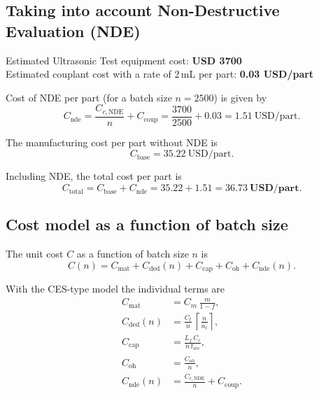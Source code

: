 \documentclass[11pt]{article}
\begin{document}
\subsection*{Taking into account Non-Destructive Evaluation (NDE)}

Estimated Ultrasonic Test equipment cost: \textbf{USD 3700} \\
Estimated couplant cost with a rate of \(2\,\text{mL}\) per part:
\textbf{0.03 USD/part}

\vspace{0.5em}
Cost of NDE per part (for a batch size \(n = 2500\)) is
given by
$$
C_{\text{nde}}
  = \frac{C_{c,\text{NDE}}}{n} + C_{\text{coup}}
  = \frac{3700}{2500} + 0.03
  = 1.51~\text{USD/part}.
$$

The manufacturing cost per part without NDE is
$$
C_{\text{base}} = 35.22~\text{USD/part}.
$$

Including NDE, the total cost per part is
$$
C_{\text{total}}
  = C_{\text{base}} + C_{\text{nde}}
  = 35.22 + 1.51
  = \mathbf{36.73~USD/part}.
$$

\newpage
\subsection*{Cost model as a function of batch size}

The unit cost \(C\) as a function of batch size \(n\) is
\begin{equation}
  C(n)
  = C_{\text{mat}}
  + C_{\text{ded}}(n)
  + C_{\text{cap}}
  + C_{\text{oh}}
  + C_{\text{nde}}(n).
\end{equation}

With the CES-type model the individual terms are
\begin{align}
  C_{\text{mat}}
    &= C_m \,\frac{m}{1-f}, \\[2pt]
  C_{\text{ded}}(n)
    &= \frac{C_t}{n}\,
       \left\lceil \frac{n}{n_t} \right\rceil, \\[2pt]
  C_{\text{cap}}
    &= \frac{L_f\,C_c}{\dot{n}\,t_{wo}}, \\[2pt]
  C_{\text{oh}}
    &= \frac{\dot{C}_{oh}}{\dot{n}}, \\[2pt]
  C_{\text{nde}}(n)
    &= \frac{C_{c,\text{NDE}}}{n} + C_{\text{coup}}.
\end{align}
\end{document}
